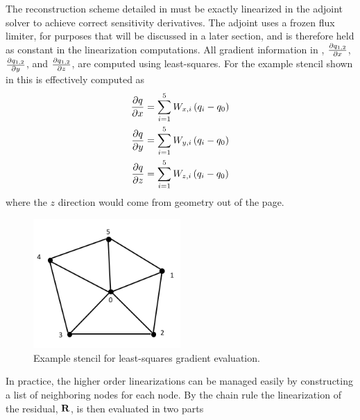 The reconstruction scheme detailed in  must
be exactly linearized in the adjoint solver to achieve correct sensitivity
derivatives. The adjoint uses a frozen flux limiter, for purposes that will be
discussed in a later section, and is therefore held as constant in the
linearization computations.  All gradient information in ,
$\frac{\partial q_{1,2}}{\partial x}$, $\frac{\partial q_{1,2}}{\partial y}$, and $\frac{\partial q_{1,2}}{\partial z}$, are computed using
least-squares.  For the example stencil shown in  this
is effectively computed as
\begin{equation}
  \begin{aligned}
    \frac{\partial q}{\partial x} &= \sum_{i=1}^{5}{W_{x,i}\left( q_i - q_0 \right)} \\
    \frac{\partial q}{\partial y} &= \sum_{i=1}^{5}{W_{y,i}\left( q_i - q_0 \right)} \\
    \frac{\partial q}{\partial z} &= \sum_{i=1}^{5}{W_{z,i}\left( q_i - q_0 \right)}
  \end{aligned}
  \label{grad-construction}
\end{equation}
where the $z$ direction would come from geometry out of the page.
\begin{figure}[h]
  \centering
  \includegraphics[width=0.5\textwidth]{figures/stencil.png}
  \caption{Example stencil for least-squares gradient evaluation.}
  \label{fig:lsq-gradients}
\end{figure}
In practice, the higher order linearizations can be managed easily by
constructing a list of neighboring nodes for each node.  By the chain rule the
linearization of the residual, $\mathbf R$, is then evaluated in two parts
